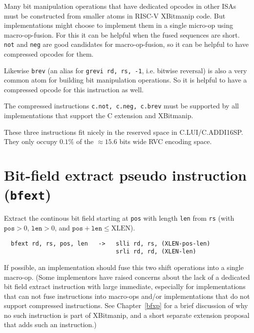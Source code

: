 Many bit manipulation operations that have dedicated opcodes in other ISAs
must be constructed from smaller atoms in RISC-V XBitmanip code. But
implementations might choose to implement them in a single micro-op using
macro-op-fusion. For this it can be helpful when the fused sequences are short.
\texttt{not} and \texttt{neg} are good candidates for macro-op-fusion, so
it can be helpful to have compressed opcodes for them.

Likewise \texttt{brev} (an alias for \texttt{grevi\ rd,\ rs,\ -1}, i.e. bitwise
reversal) is also a very common atom for building bit manipulation operations. So it
is helpful to have a compressed opcode for this instruction as well.

The compressed instructions \texttt{c.not,\ c.neg,\ c.brev} must be supported by
all implementations that support the C extension and XBitmanip.



These three instructions fit nicely in the reserved space in C.LUI/C.ADDI16SP.
They only occupy $0.1\%$ of the $\approx15.6$ bits wide RVC encoding space.


\section{Bit-field extract pseudo instruction ({\tt bfext})}
\label{bfext}

Extract the continous bit field starting at {\tt pos} with length {\tt len}
from {\tt rs} (with $\texttt{pos}>0$, $\texttt{len}>0$, and
$\texttt{pos}+\texttt{len}\le\textrm{XLEN}$).

\begin{verbatim}
  bfext rd, rs, pos, len   ->   slli rd, rs, (XLEN-pos-len)
                                srli rd, rd, (XLEN-len)
\end{verbatim}

If possible, an implementation should fuse this two shift operations into a single
macro-op. (Some implementors have raised concerns about the lack of a dedicated
bit field extract instruction with large immediate, especially for implementations
that can not fuse instructions into macro-ops and/or implementations that do
not support compressed instructions. See Chapter~\ref{bfxp} for a brief discussion
of why no such instruction is part of XBitmanip, and a short separate extension
proposal that adds such an instruction.)
